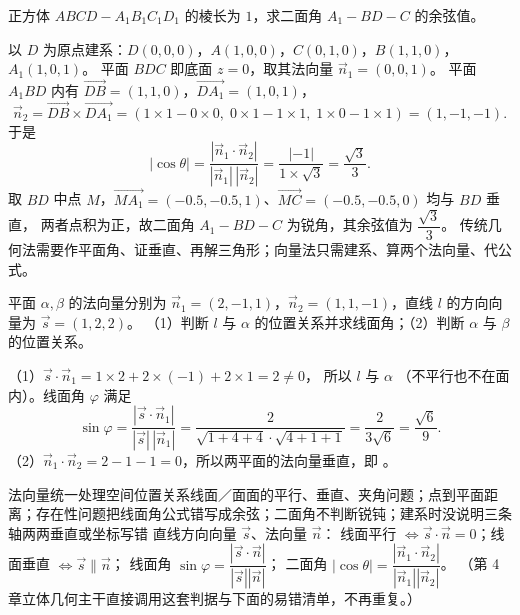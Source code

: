\begin{explore}
\begin{example}
正方体 $ABCD-A_1B_1C_1D_1$ 的棱长为 $1$，求二面角 $A_1-BD-C$ 的余弦值。
\end{example}
\begin{solution}
以 $D$ 为原点建系：$D(0,0,0)$，$A(1,0,0)$，$C(0,1,0)$，$B(1,1,0)$，$A_1(1,0,1)$。
平面 $BDC$ 即底面 $z=0$，取其法向量 $\vec n_1=(0,0,1)$。
平面 $A_1BD$ 内有 $\overrightarrow{DB}=(1,1,0)$，$\overrightarrow{DA_1}=(1,0,1)$，
\[
  \vec n_2=\overrightarrow{DB}\times\overrightarrow{DA_1}
  =(1\times1-0\times0,\;0\times1-1\times1,\;1\times0-1\times1)=(1,-1,-1).
\]
于是
\[
  |\cos\theta|=\frac{|\vec n_1\cdot\vec n_2|}{|\vec n_1|\,|\vec n_2|}
  =\frac{|-1|}{1\times\sqrt3}=\frac{\sqrt3}{3}.
\]
取 $BD$ 中点 $M$，$\overrightarrow{MA_1}=(-0.5,-0.5,1)$、$\overrightarrow{MC}=(-0.5,-0.5,0)$ 均与 $BD$ 垂直，
两者点积为正，故二面角 $A_1-BD-C$ 为锐角，其余弦值为 $\dfrac{\sqrt3}{3}$。
传统几何法需要作平面角、证垂直、再解三角形；向量法只需建系、算两个法向量、代公式。
\end{solution}

\begin{example}
平面 $\alpha,\beta$ 的法向量分别为 $\vec n_1=(2,-1,1)$，$\vec n_2=(1,1,-1)$，直线 $l$ 的方向向量为 $\vec s=(1,2,2)$。
（1）判断 $l$ 与 $\alpha$ 的位置关系并求线面角；（2）判断 $\alpha$ 与 $\beta$ 的位置关系。
\end{example}
\begin{solution}
（1）$\vec s\cdot\vec n_1=1\times2+2\times(-1)+2\times1=2\neq0$，
所以 $l$ 与 $\alpha$ （不平行也不在面内）。线面角 $\varphi$ 满足
\[
  \sin\varphi=\frac{|\vec s\cdot\vec n_1|}{|\vec s|\,|\vec n_1|}
  =\frac{2}{\sqrt{1+4+4}\cdot\sqrt{4+1+1}}=\frac{2}{3\sqrt6}=\frac{\sqrt6}{9}.
\]
（2）$\vec n_1\cdot\vec n_2=2-1-1=0$，所以两平面的法向量垂直，即 \key{$\alpha\perp\beta$}。
\end{solution}

\begin{conccard}[二级]{法向量统一处理空间位置关系}{线面／面面的平行、垂直、夹角问题；点到平面距离；存在性问题}{把线面角公式错写成余弦；二面角不判断锐钝；建系时没说明三条轴两两垂直或坐标写错}
直线方向向量 $\vec s$、法向量 $\vec n$：
线面平行 $\iff\vec s\cdot\vec n=0$；线面垂直 $\iff\vec s\parallel\vec n$；
线面角 $\sin\varphi=\dfrac{|\vec s\cdot\vec n|}{|\vec s||\vec n|}$；
二面角 $|\cos\theta|=\dfrac{|\vec n_1\cdot\vec n_2|}{|\vec n_1||\vec n_2|}$。
（第 4 章立体几何主干直接调用这套判据与下面的易错清单，不再重复。）
\end{conccard}


\end{explore}
